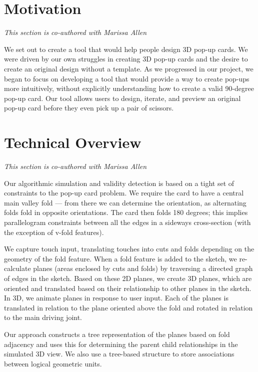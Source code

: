 \section{Motivation}\label{motivation}

\emph{This section is co-authored with Marissa Allen}

We set out to create a tool that would help people design 3D pop-up
cards. We were driven by our own struggles in creating 3D pop-up cards
and the desire to create an original design without a template. As we
progressed in our project, we began to focus on developing a tool that
would provide a way to create pop-ups more intuitively, without
explicitly understanding how to create a valid 90-degree pop-up card.
Our tool allows users to design, iterate, and preview an original pop-up
card before they even pick up a pair of scissors.

\section{Technical Overview}\label{technical-overview}

\emph{This section is co-authored with Marissa Allen}

Our algorithmic simulation and validity detection is based on a tight
set of constraints to the pop-up card problem. We require the card to
have a central main valley fold --- from there we can determine the
orientation, as alternating folds fold in opposite orientations. The
card then folds 180 degrees; this implies parallelogram constraints
between all the edges in a sideways cross-section (with the exception of
v-fold features).

We capture touch input, translating touches into cuts and folds
depending on the geometry of the fold feature. When a fold feature is
added to the sketch, we re-calculate planes (areas enclosed by cuts and
folds) by traversing a directed graph of edges in the sketch. Based on
these 2D planes, we create 3D planes, which are oriented and translated
based on their relationship to other planes in the sketch. In 3D, we
animate planes in response to user input. Each of the planes is
translated in relation to the plane oriented above the fold and rotated
in relation to the main driving joint.

Our approach constructs a tree representation of the planes based on
fold adjacency and uses this for determining the parent child
relationships in the simulated 3D view. We also use a tree-based
structure to store associations between logical geometric units.

